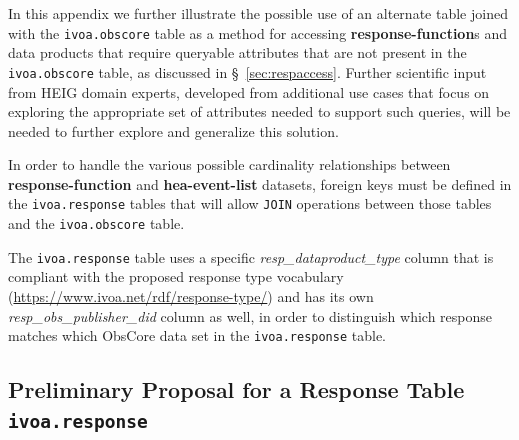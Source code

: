In this appendix we further illustrate the possible use of an alternate table joined with the {\tt ivoa.obscore} table as a method for accessing {\bf response-function}s and data products that require queryable attributes that are not present in the {\tt ivoa.obscore} table,  as discussed in \S~\ref{sec:respaccess}. Further scientific input from \gls{HEIG} domain experts, developed from additional use cases that focus on exploring the appropriate set of attributes needed to support such queries, will be needed to further explore and generalize this solution.

In order to handle the various possible cardinality relationships between {\bf response-function} and {\bf hea-event-list}  datasets, foreign keys must be defined in the {\tt ivoa.response} tables that will allow {\tt  JOIN} operations between those tables and the {\tt ivoa.obscore} table.

The {\tt ivoa.response} table uses a specific {\em resp\_dataproduct\_type\/} column that is compliant with the proposed response type vocabulary (\url{https://www.ivoa.net/rdf/response-type/}) and has its own {\em resp\_obs\_publisher\_did\/} column as well, in order to distinguish which response matches  which ObsCore data set in the {\tt ivoa.response} table.

\subsection*{Preliminary Proposal for a Response Table {\tt ivoa.response}}

